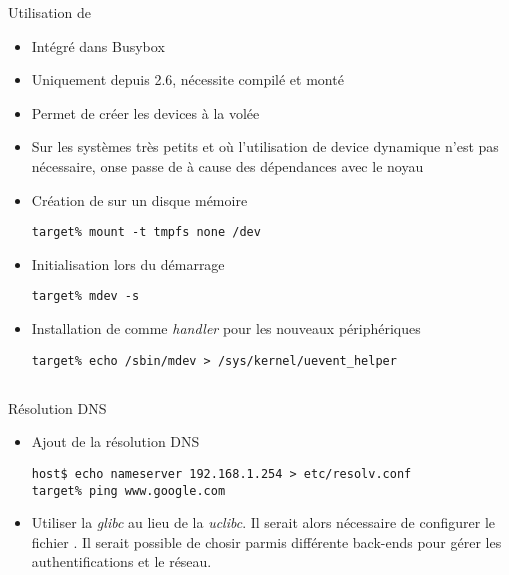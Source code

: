 \begin{frame}[fragile=singleslide]{Utilisation de }
  \begin{itemize}
  \item Intégré dans Busybox
  \item Uniquement depuis 2.6, nécessite  compilé et monté
  \item Permet de créer les devices à la volée
  \item Sur  les systèmes  très petits et  où l'utilisation  de device
    dynamique n'est  pas nécessaire, onse passe de   à cause
    des dépendances avec le noyau
  \item Création de  sur un disque mémoire
    \begin{lstlisting}
target% mount -t tmpfs none /dev
    \end{lstlisting}
  \item Initialisation  lors du démarrage
    \begin{lstlisting}
target% mdev -s
    \end{lstlisting}
  \item  Installation  de    comme \emph{handler}  pour  les
    nouveaux périphériques
    \begin{lstlisting}
target% echo /sbin/mdev > /sys/kernel/uevent_helper 
    \end{lstlisting}
  \end{itemize}
\end{frame}

\subsection{}

\begin{frame}[fragile=singleslide]{Résolution DNS}
  \begin{itemize}
  \item Ajout de la résolution DNS
    \begin{lstlisting}
host$ echo nameserver 192.168.1.254 > etc/resolv.conf
target% ping www.google.com
    \end{lstlisting}
  \item  Utiliser la  \emph{glibc}  au lieu  de  la \emph{uclibc}.  Il
    serait    alors    nécessaire    de    configurer    le    fichier
    .   Il  serait   possible  de   chosir  parmis
    différente  back-ends  pour  gérer  les  authentifications  et  le
    réseau.
  \end{itemize}
\end{frame}

